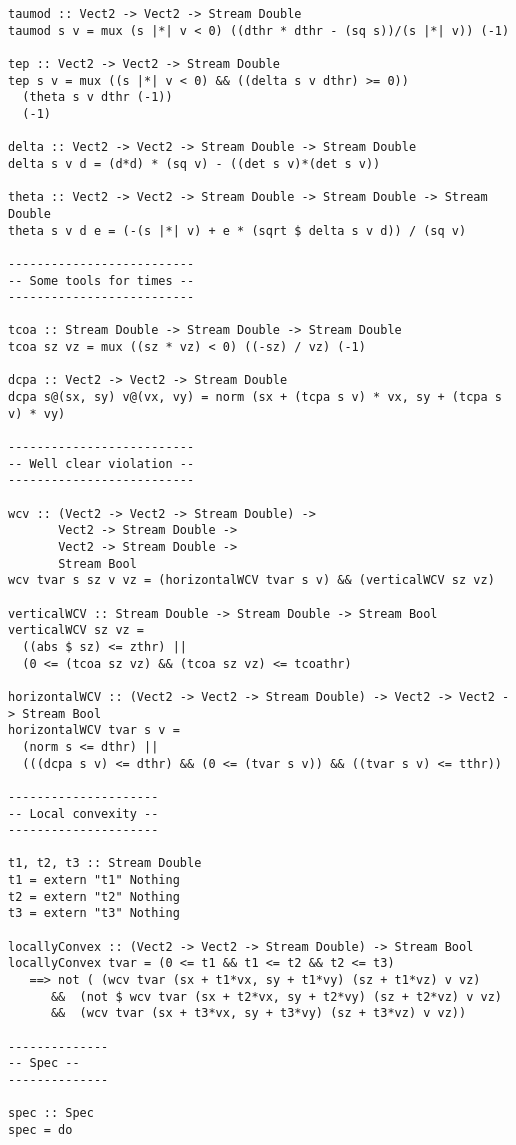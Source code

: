 \begin{lstlisting}[language=Copilot]
taumod :: Vect2 -> Vect2 -> Stream Double
taumod s v = mux (s |*| v < 0) ((dthr * dthr - (sq s))/(s |*| v)) (-1)

tep :: Vect2 -> Vect2 -> Stream Double
tep s v = mux ((s |*| v < 0) && ((delta s v dthr) >= 0))
  (theta s v dthr (-1))
  (-1)

delta :: Vect2 -> Vect2 -> Stream Double -> Stream Double
delta s v d = (d*d) * (sq v) - ((det s v)*(det s v))

theta :: Vect2 -> Vect2 -> Stream Double -> Stream Double -> Stream Double
theta s v d e = (-(s |*| v) + e * (sqrt $ delta s v d)) / (sq v)

--------------------------
-- Some tools for times --
--------------------------

tcoa :: Stream Double -> Stream Double -> Stream Double
tcoa sz vz = mux ((sz * vz) < 0) ((-sz) / vz) (-1)

dcpa :: Vect2 -> Vect2 -> Stream Double
dcpa s@(sx, sy) v@(vx, vy) = norm (sx + (tcpa s v) * vx, sy + (tcpa s v) * vy)

--------------------------
-- Well clear violation --
--------------------------

wcv :: (Vect2 -> Vect2 -> Stream Double) ->
       Vect2 -> Stream Double ->
       Vect2 -> Stream Double ->
       Stream Bool
wcv tvar s sz v vz = (horizontalWCV tvar s v) && (verticalWCV sz vz)

verticalWCV :: Stream Double -> Stream Double -> Stream Bool
verticalWCV sz vz =
  ((abs $ sz) <= zthr) ||
  (0 <= (tcoa sz vz) && (tcoa sz vz) <= tcoathr)

horizontalWCV :: (Vect2 -> Vect2 -> Stream Double) -> Vect2 -> Vect2 -> Stream Bool
horizontalWCV tvar s v =
  (norm s <= dthr) ||
  (((dcpa s v) <= dthr) && (0 <= (tvar s v)) && ((tvar s v) <= tthr))

---------------------
-- Local convexity --
---------------------

t1, t2, t3 :: Stream Double
t1 = extern "t1" Nothing
t2 = extern "t2" Nothing
t3 = extern "t3" Nothing

locallyConvex :: (Vect2 -> Vect2 -> Stream Double) -> Stream Bool
locallyConvex tvar = (0 <= t1 && t1 <= t2 && t2 <= t3)
   ==> not ( (wcv tvar (sx + t1*vx, sy + t1*vy) (sz + t1*vz) v vz)
      &&  (not $ wcv tvar (sx + t2*vx, sy + t2*vy) (sz + t2*vz) v vz)
      &&  (wcv tvar (sx + t3*vx, sy + t3*vy) (sz + t3*vz) v vz))

--------------
-- Spec --
--------------

spec :: Spec
spec = do


\end{lstlisting}

